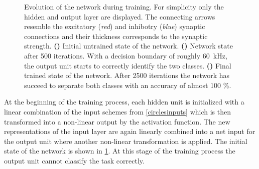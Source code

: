 \begin{figure}[t!]
	\begin{subfigure}{\textwidth}
		\caption{}
		\vspace{-0.1in}
		\centering
		
		\label{learning_process_s5}
		\vspace{-.5in}
	\end{subfigure}
	\begin{subfigure}{\textwidth}
		\caption{}
		\vspace{-0.1in}
		\centering
		
		\label{learning_process_s500}
		\vspace{-.5in}
	\end{subfigure}
	\begin{subfigure}{\textwidth}
		\caption{}
		\vspace{-0.1in}
		\centering
		
		\label{learning_process_s2500}
	\end{subfigure}
	\vspace{-.4in}
	\caption[Evolution of the network during training.]{Evolution of the network during training. For simplicity only the hidden and output layer are displayed. The connecting arrows resemble the excitatory (\emph{red}) and inhibotry (\emph{blue}) synaptic connections and their thickness corresponds to the synaptic strength. \textbf{()} Initial untrained state of the network. \textbf{()} Network state after 500 iterations. With a decision boundary of roughly \SI{60}{\kilo \Hz}, the output unit starts to correctly identify the two classes. \textbf{()} Final trained state of the network. After 2500 iterations the network has succeed to separate both classes with an accuracy of almost 100 \%.}
\end{figure}

At the beginning of the training process, each hidden unit is initialized with a linear combination of the input schemes from \cref{circlesinputs} which is then transformed into a non-linear output by the activation function. The new representations of the input layer are again linearly combined into a net input for the output unit where another non-linear transformation is applied. The initial state of the network is shown in \cref{learning_process_s5}. At this stage of the training process the output unit cannot classify the task correctly. 

%	

